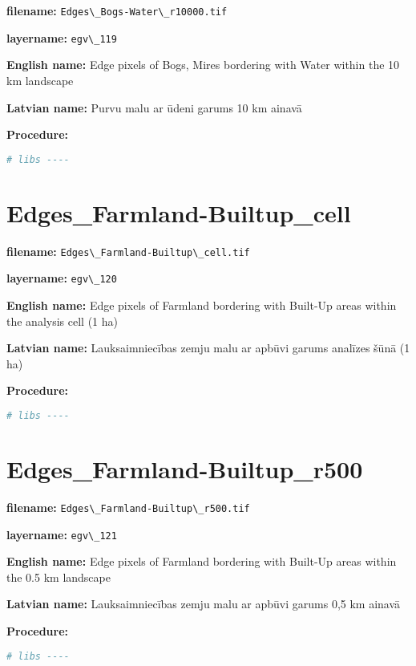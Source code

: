 \documentclass[
]{book}
\newcommand{\passthrough}[1]{#1}
\begin{document}
\textbf{filename:} \passthrough{\lstinline!Edges\_Bogs-Water\_r10000.tif!}

\textbf{layername:} \passthrough{\lstinline!egv\_119!}

\textbf{English name:} Edge pixels of Bogs, Mires bordering with Water within the 10 km landscape

\textbf{Latvian name:} Purvu malu ar ūdeni garums 10 km ainavā

\textbf{Procedure:}

\begin{lstlisting}[language=R]
# libs ----
\end{lstlisting}

\section{Edges\_Farmland-Builtup\_cell}\label{ch06.120}

\textbf{filename:} \passthrough{\lstinline!Edges\_Farmland-Builtup\_cell.tif!}

\textbf{layername:} \passthrough{\lstinline!egv\_120!}

\textbf{English name:} Edge pixels of Farmland bordering with Built-Up areas within the analysis cell (1 ha)

\textbf{Latvian name:} Lauksaimniecības zemju malu ar apbūvi garums analīzes šūnā (1 ha)

\textbf{Procedure:}

\begin{lstlisting}[language=R]
# libs ----
\end{lstlisting}

\section{Edges\_Farmland-Builtup\_r500}\label{ch06.121}

\textbf{filename:} \passthrough{\lstinline!Edges\_Farmland-Builtup\_r500.tif!}

\textbf{layername:} \passthrough{\lstinline!egv\_121!}

\textbf{English name:} Edge pixels of Farmland bordering with Built-Up areas within the 0.5 km landscape

\textbf{Latvian name:} Lauksaimniecības zemju malu ar apbūvi garums 0,5 km ainavā

\textbf{Procedure:}

\begin{lstlisting}[language=R]
# libs ----
\end{lstlisting}
\end{document}
